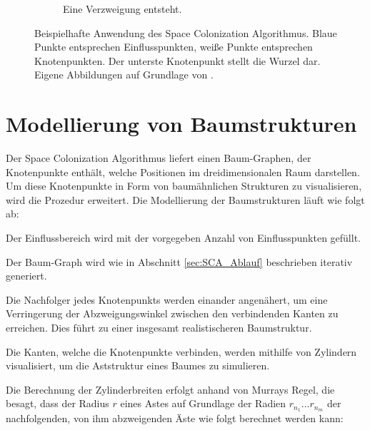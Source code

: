\begin{figure} [hbtp]
\begin{subfigure}[t]{.3\textwidth}
		\caption{Eine Verzweigung entsteht.}
		\label{subfig:SCA_Basic8}
	\end{subfigure}
	\caption{Beispielhafte Anwendung des Space Colonization Algorithmus. Blaue Punkte entsprechen Einflusspunkten, weiße Punkte entsprechen Knotenpunkten. Der unterste Knotenpunkt stellt die Wurzel dar. Eigene Abbildungen auf Grundlage von \cite[Abb. 2]{SpaceColonizationAlgorithm:07}.}\label{fig:SCA_Basic}
	
\end{figure}


\section{Modellierung von Baumstrukturen}
\label{sec:ModellierungBaumstrukturen}
Der Space Colonization Algorithmus liefert einen Baum-Graphen, der Knotenpunkte enthält, welche Positionen im dreidimensionalen Raum darstellen. Um diese Knotenpunkte in Form von baumähnlichen Strukturen zu visualisieren, wird die Prozedur erweitert. Die Modellierung der Baumstrukturen läuft wie folgt ab:

\begin{description}[labelindent]
	\item[\boldmath$1.$] Der Einflussbereich wird mit der vorgegeben Anzahl von Einflusspunkten gefüllt. \cite[Abschn. 2]{SpaceColonizationAlgorithm:07} \\

	\item[\boldmath$2.$] Der Baum-Graph wird wie in Abschnitt \ref{sec:SCA_Ablauf} beschrieben iterativ generiert. \cite[Abschn. 2]{SpaceColonizationAlgorithm:07} \\

	\item[\boldmath$3.$] Die Nachfolger jedes Knotenpunkts werden einander angenähert, um eine Verringerung der Abzweigungswinkel zwischen den verbindenden Kanten zu erreichen. Dies führt zu einer insgesamt realistischeren Baumstruktur. \cite[Abschn. 2]{SpaceColonizationAlgorithm:07} \\
	
	\item[\boldmath$4.$] Die Kanten, welche die Knotenpunkte verbinden, werden mithilfe von Zylindern visualisiert, um die Aststruktur eines Baumes zu simulieren. \cite[Abschn. 2]{SpaceColonizationAlgorithm:07} 
	
\end{description}

Die Berechnung der Zylinderbreiten erfolgt anhand von Murrays Regel, die besagt, dass der Radius $r$ eines Astes auf Grundlage der Radien $r_{n_1}...r_{n_m}$ der nachfolgenden, von ihm abzweigenden Äste wie folgt berechnet werden kann: 

